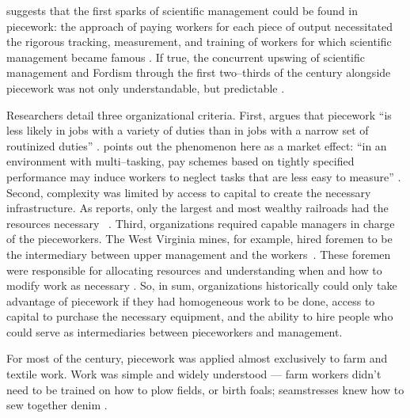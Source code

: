 \documentclass[trackingWork]{subfiles}
\begin{document}
\citeauthor{10.2307/23702539} suggests that the first sparks of scientific management
could be found in piecework:
the approach of paying workers for each piece of output necessitated
the rigorous tracking, measurement, and training of workers
for which scientific management became famous
\cite{10.2307/23702539}.
If true, 
the concurrent upswing of
scientific management and Fordism
through the first two--thirds of the  century
alongside piecework was not only understandable, but predictable
\cite{hart2013rise}.

Researchers detail three organizational criteria.
First, \citeauthor{Brown01041990} argues that
piecework ``is less likely in jobs with a variety of duties than in
jobs with a narrow set of routinized duties''
\cite{Brown01041990}.
\citeauthor{SJOE:SJOE371} points out the phenomenon here as a market effect:
``in an environment with multi--tasking,
pay schemes based on tightly specified performance may
induce workers to neglect tasks that are less easy to measure''
\cite{SJOE:SJOE371}.
Second,
complexity was limited by access to capital to create the necessary infrastructure.
As \citeauthor{10.2307/23702539} reports,
only the largest and most wealthy railroads had the resources
necessary
~\cite{10.2307/23702539}.
Third, organizations required capable managers in charge of the pieceworkers.
The West Virginia mines, for example, hired foremen 
to be the intermediary between upper management and the workers~\cite{10.2307/2118435}.
These foremen were responsible for allocating resources and
understanding when and how to modify work as necessary
\cite{wray1949marginal}.
So, in sum,
organizations historically could only take advantage of piecework if they had
homogeneous work to be done,
access to capital to purchase the necessary equipment, and
the ability to hire people who could serve as intermediaries between pieceworkers and management.

For most of the  century,
piecework was applied almost exclusively to farm and textile work.
Work was simple and widely understood
--- farm workers didn't need to be trained on how to plow fields, or birth foals;
seamstresses knew how to sew together denim
\cite{10.2307/2338394,riisOtherSideLives}.
\end{document}
